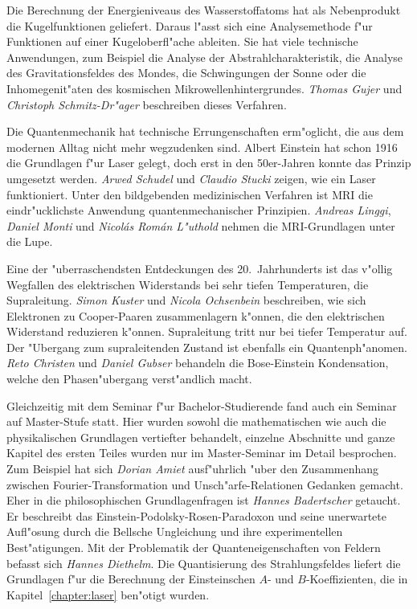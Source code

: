 Die Berechnung der Energieniveaus des Wasserstoffatoms hat als
Nebenprodukt die Kugelfunktionen geliefert.
Daraus l"asst sich eine Analysemethode f"ur Funktionen auf einer
Kugeloberfl"ache ableiten.
Sie hat viele technische Anwendungen, zum Beispiel die Analyse der
Abstrahlcharakteristik, die Analyse des Gravitationsfeldes des
Mondes, die Schwingungen der Sonne oder die Inhomegenit"aten des
kosmischen Mikrowellenhintergrundes.
{\em Thomas Gujer} und {\em Christoph Schmitz-Dr"ager} beschreiben
dieses Verfahren.

Die Quantenmechanik hat technische Errungenschaften erm"oglicht, die
aus dem modernen Alltag nicht mehr wegzudenken sind.
Albert Einstein hat schon 1916 die Grundlagen f"ur Laser gelegt,
doch erst in den 50er-Jahren konnte das Prinzip umgesetzt werden.
{\em Arwed Schudel} und {\em Claudio Stucki} zeigen, wie ein Laser funktioniert.
Unter den bildgebenden medizinischen Verfahren ist MRI die eindr"ucklichste
Anwendung quantenmechanischer Prinzipien.
{\em Andreas Linggi}, {\em Daniel Monti} und {\em Nicol\'as Rom\'an L"uthold}
nehmen die MRI-Grundlagen unter die Lupe.

Eine der "uberraschendsten Entdeckungen des 20.~Jahrhunderts ist das
v"ollig Wegfallen des elektrischen Widerstands bei sehr tiefen 
Temperaturen, die Supraleitung.
{\em Simon Kuster} und {\em Nicola Ochsenbein} beschreiben, wie sich
Elektronen zu Cooper-Paaren zusammenlagern k"onnen, die
den elektrischen Widerstand reduzieren k"onnen.
Supraleitung tritt nur bei tiefer Temperatur auf.
Der "Ubergang zum supraleitenden Zustand ist ebenfalls ein Quantenph"anomen.
{\em Reto Christen} und {\em Daniel Gubser} behandeln die Bose-Einstein
Kondensation, welche den Phasen"ubergang verst"andlich macht.

Gleichzeitig mit dem Seminar f"ur Bachelor-Studierende fand auch ein
Seminar auf Master-Stufe statt.
Hier wurden sowohl die mathematischen wie auch die physikalischen Grundlagen
vertiefter behandelt, einzelne Abschnitte und ganze Kapitel des ersten
Teiles wurden nur im Master-Seminar im Detail besprochen.
Zum Beispiel hat sich {\em Dorian Amiet} ausf"uhrlich
"uber den Zusammenhang zwischen Fourier-Transformation und 
Unsch"arfe-Relationen Gedanken gemacht.
Eher in die philosophischen Grundlagenfragen ist {\em Hannes Badertscher}
getaucht. Er beschreibt das Einstein-Podolsky-Rosen-Paradoxon und seine
unerwartete Aufl"osung durch die Bellsche Ungleichung und ihre experimentellen
Best"atigungen.
Mit der Problematik der Quanteneigenschaften von Feldern befasst sich
{\em Hannes Diethelm}. 
Die Quantisierung des Strahlungsfeldes liefert die Grundlagen f"ur die
Berechnung der Einsteinschen $A$- und $B$-Koeffizienten, die in 
Kapitel~\ref{chapter:laser} ben"otigt wurden.

